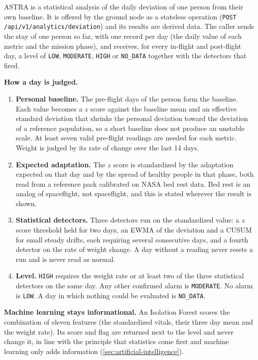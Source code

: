 ASTRA is a statistical analysis of the daily deviation of one person from their own baseline. It is offered by the ground node as a stateless operation (\texttt{POST /api/v1/analytics/deviation}) and its results are derived data. The caller sends the stay of one person so far, with one record per day (the daily value of each metric and the mission phase), and receives, for every in-flight and post-flight day, a level of \texttt{LOW}, \texttt{MODERATE}, \texttt{HIGH} or \texttt{NO\_DATA} together with the detectors that fired.

\medskip\noindent\textbf{How a day is judged.}
\begin{enumerate}
\item \textbf{Personal baseline.} The pre-flight days of the person form the baseline. Each value becomes a $z$ score against the baseline mean and an effective standard deviation that shrinks the personal deviation toward the deviation of a reference population, so a short baseline does not produce an unstable scale. At least seven valid pre-flight readings are needed for each metric. Weight is judged by its rate of change over the last 14 days.
\item \textbf{Expected adaptation.} The $z$ score is standardized by the adaptation expected on that day and by the spread of healthy people in that phase, both read from a reference pack calibrated on NASA bed rest data. Bed rest is an analog of spaceflight, not spaceflight, and this is stated wherever the result is shown.
\item \textbf{Statistical detectors.} Three detectors run on the standardized value: a $z$ score threshold held for two days, an EWMA of the deviation and a CUSUM for small steady drifts, each requiring several consecutive days, and a fourth detector on the rate of weight change. A day without a reading never resets a run and is never read as normal.
\item \textbf{Level.} \texttt{HIGH} requires the weight rate or at least two of the three statistical detectors on the same day. Any other confirmed alarm is \texttt{MODERATE}. No alarm is \texttt{LOW}. A day in which nothing could be evaluated is \texttt{NO\_DATA}.
\end{enumerate}

\medskip\noindent\textbf{Machine learning stays informational.} An Isolation Forest scores the combination of eleven features (the standardized vitals, their three day mean and the weight rate). Its score and flag are returned next to the level and never change it, in line with the principle that statistics come first and machine learning only adds information (\ref{sec:artificial-intelligence}).


